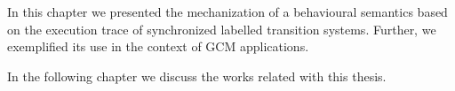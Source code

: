 	
	
		




\chapbreak

	In this chapter we presented the mechanization of a behavioural 
semantics based on the execution trace of synchronized labelled transition systems. Further, we
exemplified its use in the context of \ac{GCM} applications.
	
	In the following chapter we discuss the works related with this thesis.



